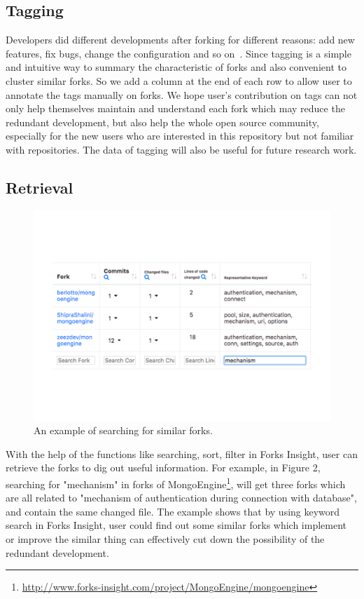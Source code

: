 \subsection{Tagging}
Developers did different developments after forking for different reasons: add new features, fix bugs, change the configuration and so on~\cite{Mikkonen2011,Robles2012,dubinsky2013exploratory,stanciulescu2015forked}.
Since tagging is a simple and intuitive way to summary the characteristic of forks and also convenient to cluster similar forks. So we add a column at the end of each row to allow user to annotate the tags manually on forks. We hope user's contribution on tags can not only help themselves maintain and understand each fork which may reduce the redundant development, but also help the whole open source community, especially for the new users who are interested in this repository but not familiar with repositories. The data of tagging will also be useful for future research work.

\subsection{Retrieval}

\begin{figure}[]
\centering
\includegraphics[scale=0.3]{pic5.pdf}
\caption{An example of searching for similar forks.}
\vspace{5pt}
\end{figure}

With the help of the functions like searching, sort, filter in Forks Insight, user can retrieve the forks to dig out useful information. For example, in Figure 2, searching for "mechanism" in forks of MongoEngine\footnote{\url{http://www.forks-insight.com/project/MongoEngine/mongoengine}}, will get three forks which are all related to "mechanism of authentication during connection with database", and contain the same changed file. The example shows that by using keyword search in Forks Insight, user could find out some similar forks which implement or improve the similar thing can effectively  cut down the possibility of the redundant development.

